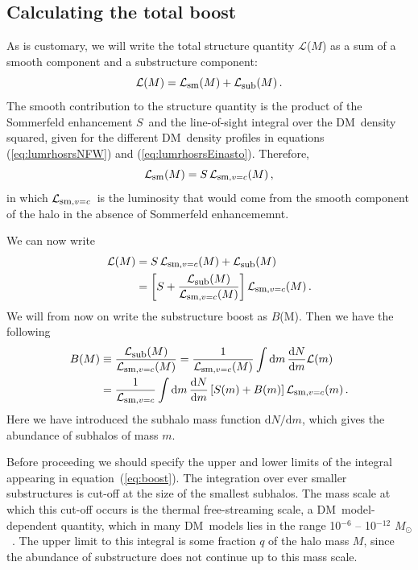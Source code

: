 \documentclass[aps,prd,twocolumn,amsmath,amssymb,floatfix,nofootinbib,10pt]{revtex4}
\newcommand{\DM}{DM}
\newcommand{\somm}{\ensuremath{S}}
\newcommand{\dd}{\mathrm{d}}
\newcommand{\eqnname}{equation}
\newcommand{\lum}{\ensuremath{\mathcal{L}}}
\newcommand{\lumsmooth}{\ensuremath{\lum_{\mbox{{\footnotesize sm}}}}}
\newcommand{\lumsmoothc}{\ensuremath{\lum_{\mbox{{\footnotesize sm}},v=c}}}
\newcommand{\lumsub}{\ensuremath{\lum_{\mbox{{\footnotesize sub}}}}}
\newcommand{\boost}{\ensuremath{B}}
\newcommand{\Msol}{\ensuremath{M_{\odot}}}
\begin{document}
\subsection{Calculating the total boost}

As is customary, we will write the total structure quantity \lum($M$) as a
sum of a smooth component and a substructure component:
\begin{equation}
\lum(M) = \lumsmooth(M) + \lumsub(M)\, .
\end{equation}
The smooth contribution to the structure quantity is the product of
the Sommerfeld enhancement \somm\ and the line-of-sight integral over
the \DM\ density squared, given for the different \DM\ density
profiles in \eqnname s (\ref{eq:lumrhosrsNFW}) and
(\ref{eq:lumrhosrsEinasto}). Therefore,
\begin{equation}
\lumsmooth(M) = \somm \, \lumsmoothc(M)\, ,
\end{equation}
in which \lumsmoothc\ is the luminosity that would come from the
smooth component of the halo in the absence of Sommerfeld
enhancememnt.

We can now write
\begin{equation}
\begin{split}
\lum(M) & = \somm\,\lumsmoothc(M) + \lumsub(M)\\
&= \left[ \somm + \frac{\lumsub(M)}{\lumsmoothc(M)}\right] \lumsmoothc(M)\, .
\end{split}
\end{equation}
We will from now on write the substructure boost as \boost(M). Then we
have the following
\begin{equation}\label{eq:boost}
\begin{split}
\boost(M) & \equiv \frac{\lumsub(M)}{\lumsmoothc(M)} = \frac{1}{\lumsmoothc(M)} \int \dd m \, \frac{\dd N}{\dd m} \lum(m)\\
&= \frac{1}{\lumsmoothc} \int \dd m\, \frac{\dd N}{\dd m} \left[ \somm(m) + \boost(m) \right] \lumsmoothc(m)\, .
\end{split}
\end{equation}
Here we have introduced the subhalo mass function $\dd N/\dd m$, which
gives the abundance of subhalos of mass $m$.

Before proceeding we should specify the upper and lower limits of the
integral appearing in \eqnname\ (\ref{eq:boost}). The integration over
ever smaller substructures is cut-off at the size of the smallest
subhalos. The mass scale at which this cut-off occurs is the thermal
free-streaming scale, a \DM\ model-dependent quantity, which in many
\DM\ models lies in the range 10$^{-6}$ -- 10$^{-12}$ \Msol\
\cite{1999PhRvD..59d3517S,2001PhRvD..64h3507H,2004MNRAS.353L..23G,2005PhRvD..71j3520L,2006PhRvL..97c1301P}. The
upper limit to this integral is some fraction $q$ of the halo mass
$M$, since the abundance of substructure does not continue up to this
mass scale.
\end{document}
